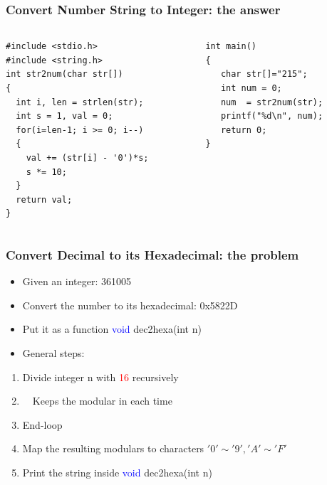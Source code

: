 \ifx\answer{}
\begin{frame}[fragile]
\frametitle{Convert Number String to Integer: the answer}
\vspace{-0.2in}
\begin{columns}
\begin{column}{0.55\linewidth}
\begin{lstlisting}[xleftmargin=0.05\linewidth,linewidth=0.95\linewidth]
#include <stdio.h>
#include <string.h>
int str2num(char str[])
{
  int i, len = strlen(str);
  int s = 1, val = 0;
  for(i=len-1; i >= 0; i--)
  {
    val += (str[i] - '0')*s;
	s *= 10;
  }
  return val;
}
\end{lstlisting}
\end{column}
\begin{column}{0.450\linewidth}
\begin{lstlisting}[firstnumber=14, linewidth=0.95\linewidth]
int main()
{
   char str[]="215";
   int num = 0;
   num  = str2num(str);
   printf("%d\n", num);
   return 0;
}
\end{lstlisting}
\end{column}
\end{columns}
\end{frame}
\fi


\begin{frame}
\frametitle{Convert Decimal to its Hexadecimal: the problem}
\begin{itemize}
	\item {Given an integer: 361005}
	\item {Convert the number to its hexadecimal: 0x5822D}
	\item {Put it as a function \textcolor{blue}{void} dec2hexa(int n)}
	\item {General steps:}
\end{itemize}
\begin{enumerate}
	\item {Divide integer n with \textcolor{red}{16} recursively}
	\item {~~Keeps the modular in each time}
	\item {End-loop}
	\item {Map the resulting modulars to characters $'0'{\sim}'9', 'A'{\sim}'F'$}
	\item {Print the string inside \textcolor{blue}{void} dec2hexa(int n)}
\end{enumerate}

\end{frame}

